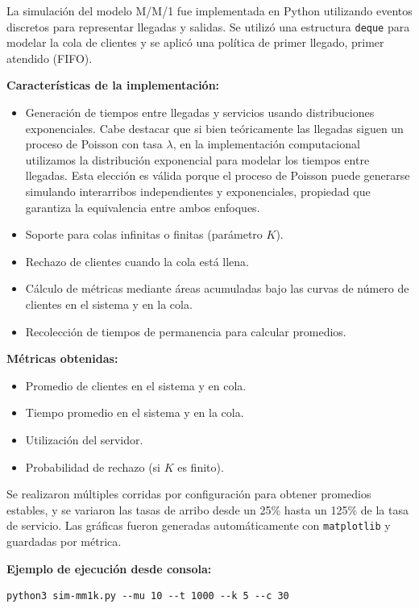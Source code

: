 \documentclass[12pt]{article}
\begin{document}
La simulación del modelo M/M/1 fue implementada en Python utilizando eventos discretos para representar llegadas y salidas. Se utilizó una estructura \texttt{deque} para modelar la cola de clientes y se aplicó una política de primer llegado, primer atendido (FIFO).

\textbf{Características de la implementación:}
\begin{itemize}
    \item Generación de tiempos entre llegadas y servicios usando distribuciones exponenciales. Cabe destacar que si bien teóricamente las llegadas siguen un proceso de Poisson con tasa $\lambda$, en la implementación computacional utilizamos la distribución exponencial para modelar los tiempos entre llegadas. Esta elección es válida porque el proceso de Poisson puede generarse simulando interarribos independientes y exponenciales, propiedad que garantiza la equivalencia entre ambos enfoques.
    \item Soporte para colas infinitas o finitas (parámetro $K$).
    \item Rechazo de clientes cuando la cola está llena.
    \item Cálculo de métricas mediante áreas acumuladas bajo las curvas de número de clientes en el sistema y en la cola.
    \item Recolección de tiempos de permanencia para calcular promedios.
\end{itemize}

\textbf{Métricas obtenidas:}
\begin{itemize}
    \item Promedio de clientes en el sistema y en cola.
    \item Tiempo promedio en el sistema y en la cola.
    \item Utilización del servidor.
    \item Probabilidad de rechazo (si $K$ es finito).
\end{itemize}

Se realizaron múltiples corridas por configuración para obtener promedios estables, y se variaron las tasas de arribo desde un 25\% hasta un 125\% de la tasa de servicio. Las gráficas fueron generadas automáticamente con \texttt{matplotlib} y guardadas por métrica.

\textbf{Ejemplo de ejecución desde consola:}
\begin{verbatim}
python3 sim-mm1k.py --mu 10 --t 1000 --k 5 --c 30
\end{verbatim}
\end{document}
